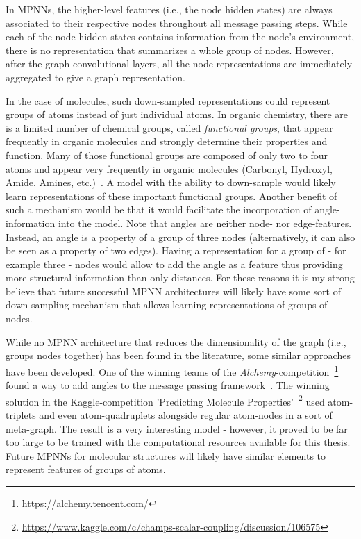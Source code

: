 In MPNNs, the higher-level features (i.e., the node hidden states) are always associated to their respective nodes throughout all message passing steps. While each of the node hidden states contains information from the node's environment, there is no representation that summarizes a whole group of nodes. However, after the graph convolutional layers, all the node representations are immediately aggregated to give a graph representation.

In the case of molecules, such down-sampled representations could represent groups of atoms instead of just individual atoms. In organic chemistry, there are is a limited number of chemical groups, called \textit{functional groups}, that appear frequently in organic molecules and strongly determine their properties and function. Many of those functional groups are composed of only two to four atoms and appear very frequently in organic molecules (Carbonyl, Hydroxyl, Amide, Amines, etc.)~\cite{Organic-chemistry}. A model with the ability to down-sample would likely learn representations of these important functional groups. Another benefit of such a mechanism would be that it would facilitate the incorporation of angle-information into the model. Note that angles are neither node- nor edge-features. Instead, an angle is a property of a group of three nodes (alternatively, it can also be seen as a property of two edges). Having a representation for a group of - for example three - nodes would allow to add the angle as a feature thus providing more structural information than only distances. For these reasons it is my strong believe that future successful MPNN architectures will likely have some sort of down-sampling mechanism that allows learning representations of groups of nodes.

While no MPNN architecture that reduces the dimensionality of the graph (i.e., groups nodes together) has been found in the literature, some similar approaches have been developed. One of the winning teams of the \textit{Alchemy}-competition~\footnote{\url{https://alchemy.tencent.com/}} found a way to add angles to the message passing framework~\cite{Klicpera2019}. The winning solution in the Kaggle-competition 'Predicting Molecule Properties'~\footnote{\url{https://www.kaggle.com/c/champs-scalar-coupling/discussion/106575}} used atom-triplets and even atom-quadruplets alongside regular atom-nodes in a sort of meta-graph. The result is a very interesting model - however, it proved to be far too large to be trained with the computational resources available for this thesis. Future MPNNs for molecular structures will likely have similar elements to represent features of groups of atoms.

